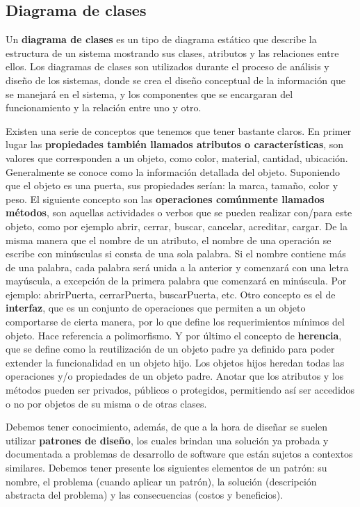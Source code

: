 \documentclass[a4paper,oneside,11pt]{book}
\begin{document}
	
	\subsection{Diagrama de clases} %
		\label{sec:diagrama_de_clases}

			Un \textbf{diagrama de clases} es un tipo de diagrama estático que describe la estructura de un sistema mostrando sus clases, atributos y las relaciones entre ellos. Los diagramas de clases son utilizados durante el proceso de análisis y diseño de los sistemas, donde se crea el diseño conceptual de la información que se manejará en el sistema, y los componentes que se encargaran del funcionamiento y la relación entre uno y otro.

			Existen una serie de conceptos que tenemos que tener bastante claros. En primer lugar las \textbf{propiedades también llamados atributos o características}, son valores que corresponden a un objeto, como color, material, cantidad, ubicación. Generalmente se conoce como la información detallada del objeto. Suponiendo que el objeto es una puerta, sus propiedades serían: la marca, tamaño, color y peso.	El siguiente concepto son las \textbf{operaciones comúnmente llamados métodos}, son aquellas actividades o verbos que se pueden realizar con/para este objeto, como por ejemplo abrir, cerrar, buscar, cancelar, acreditar, cargar. De la misma manera que el nombre de un atributo, el nombre de una operación se escribe con minúsculas si consta de una sola palabra. Si el nombre contiene más de una palabra, cada palabra será unida a la anterior y comenzará con una letra mayúscula, a excepción de la primera palabra que comenzará en minúscula. Por ejemplo: abrirPuerta, cerrarPuerta, buscarPuerta, etc. Otro concepto es el de \textbf{interfaz}, que es un conjunto de operaciones que permiten a un objeto comportarse de cierta manera, por lo que define los requerimientos mínimos del objeto. Hace referencia a polimorfismo. Y por último el concepto de \textbf{herencia}, que se define como la reutilización de un objeto padre ya definido para poder extender la funcionalidad en un objeto hijo. Los objetos hijos heredan todas las operaciones y/o propiedades de un objeto padre. Anotar que los atributos y los métodos pueden ser privados, públicos o protegidos, permitiendo así ser accedidos o no por objetos de su misma o de otras clases. 

			Debemos tener conocimiento, además, de que a la hora de diseñar se suelen utilizar \textbf{patrones de diseño}, los cuales brindan una solución ya probada y documentada a problemas de desarrollo de software que están sujetos a contextos similares. Debemos tener presente los siguientes elementos de un patrón: su nombre, el problema (cuando aplicar un patrón), la solución (descripción abstracta del problema) y las consecuencias (costos y beneficios).
\end{document}
